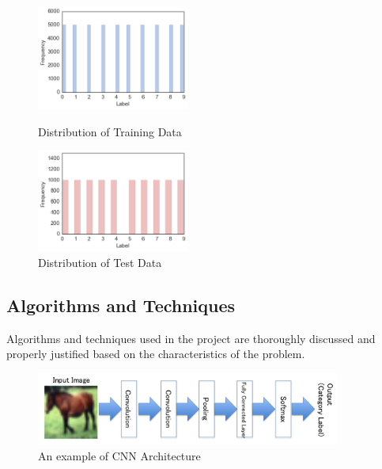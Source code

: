 \documentclass[a4paper,10pt,fleqn]{article}
\begin{document}
\begin{figure}[htbp]
\begin{minipage}{0.5\hsize}
	\begin{center}
	\includegraphics[width=5cm]{picture/Distribution_of_Training_Data.png}
	\end{center}
	\caption{Distribution of Training Data}
	\label{fig:three}
\end{minipage}
\begin{minipage}{0.5\hsize}
\begin{center}
\includegraphics[width=5cm]{picture/Distribution_of_Test_Data.png}
\end{center}
 \caption{Distribution of Test Data}
  \label{fig:four}
 \end{minipage}
\end{figure}


\subsection{Algorithms and Techniques}
Algorithms and techniques used in the project are thoroughly discussed and properly justified based on the characteristics of the problem.

\begin{figure}[htbp]

	\begin{center}
	\includegraphics[width=10cm]{picture/Architecture_of_CNN.png}
	\caption{An example of CNN Architecture}
	\end{center}
	
	\label{fig:four}

\end{figure}
\end{document}
